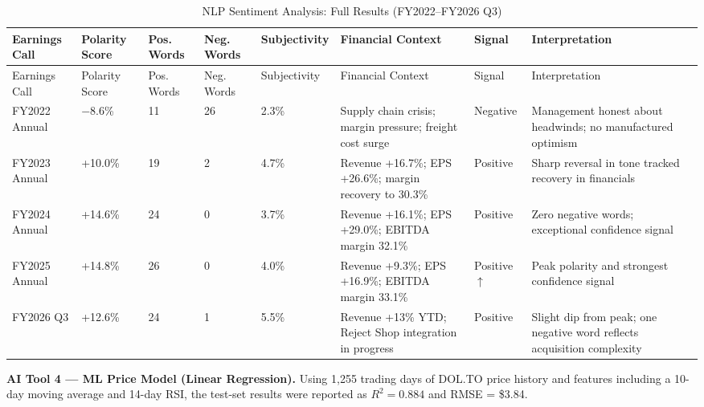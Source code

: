 \documentclass[11pt]{article}
\begin{document}
\begingroup
\small
\setlength{\tabcolsep}{4pt}
\setlength{\LTleft}{0pt}
\setlength{\LTright}{0pt}
\begin{longtable}{P{2.8cm} C{1.5cm} C{1.1cm} C{1.1cm} C{1.4cm} P{3.2cm} P{1.6cm} P{3.2cm}}
\caption{NLP Sentiment Analysis: Full Results (FY2022--FY2026 Q3)}\\
\toprule
{}
Earnings Call & Polarity Score & Pos. Words & Neg. Words & Subjectivity & Financial Context & Signal & Interpretation \\
\midrule
\endfirsthead
\toprule
{}
Earnings Call & Polarity Score & Pos. Words & Neg. Words & Subjectivity & Financial Context & Signal & Interpretation \\
\midrule
\endhead
FY2022 Annual & $-$8.6\% & 11 & 26 & 2.3\% & Supply chain crisis; margin pressure; freight cost surge & Negative & Management honest about headwinds; no manufactured optimism \\
FY2023 Annual & +10.0\% & 19 & 2 & 4.7\% & Revenue +16.7\%; EPS +26.6\%; margin recovery to 30.3\% & Positive & Sharp reversal in tone tracked recovery in financials \\
FY2024 Annual & +14.6\% & 24 & 0 & 3.7\% & Revenue +16.1\%; EPS +29.0\%; EBITDA margin 32.1\% & Positive & Zero negative words; exceptional confidence signal \\
FY2025 Annual & +14.8\% & 26 & 0 & 4.0\% & Revenue +9.3\%; EPS +16.9\%; EBITDA margin 33.1\% & Positive $\uparrow$ & Peak polarity and strongest confidence signal \\
FY2026 Q3 & +12.6\% & 24 & 1 & 5.5\% & Revenue +13\% YTD; Reject Shop integration in progress & Positive & Slight dip from peak; one negative word reflects acquisition complexity \\
\bottomrule
\end{longtable}
\endgroup

\textbf{AI Tool 4 --- ML Price Model (Linear Regression).} Using 1,255 trading days of DOL.TO price history and features including a 10-day moving average and 14-day RSI, the test-set results were reported as $R^2 = 0.884$ and RMSE = \$3.84.
\end{document}

